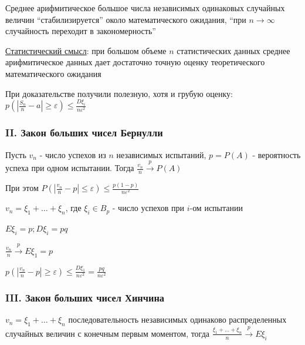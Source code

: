 \documentclass[12pt]{article}
\begin{document}
    Среднее арифмитическое большое числа независимых одинаковых случайных величин \enquote{стабилизируется} около математического ожидания,
    \enquote{при $n \to \infty$ случайность переходит в закономерность}

    \underline{Статистический смысл}: при большом объеме $n$ статистических данных среднее арифмитическое данных
    дает достаточно точную оценку теоретического математического ожидания

    \Nota При доказательстве получили полезную, хотя и грубую оценку: $p\left(\left|\frac{S_n}{n} - a\right| \geq \varepsilon\right) \leq \frac{D\xi_i}{n\varepsilon^2}$

    \subsubsection{II. Закон больших чисел Бернулли}

    \begin{MyTheorem}
        \Ths Пусть $v_n$ - число успехов из $n$ независимых испытаний, $p = P(A)$ - вероятность успеха при одном испытании.
        Тогда $\frac{v_n}{n} \overset{p}{\longrightarrow} P(A)$
    \end{MyTheorem}

    При этом $P\left(\left|\frac{v_n}{n} - p\right| \leq \varepsilon\right) \leq \frac{p(1 - p)}{n\varepsilon^2}$

    \begin{MyProof}
        $v_n = \xi_1 + \dots + \xi_n$, где $\xi_i \in B_p$ - число успехов при $i$-ом испытании

        $E\xi_i = p; D\xi_i = pq$

        $\frac{v_n}{n} \overset{p}{\longrightarrow} E\xi_1 = p$

        $p\left(\left|\frac{v_n}{n} - p\right| \geq \varepsilon\right) \leq \frac{D\xi_1}{n\varepsilon^2} = \frac{pq}{n\varepsilon^2}$
    \end{MyProof}

    \subsubsection{III. Закон больших чисел Хинчина}

    \begin{MyTheorem}
        \Ths $v_n = \xi_1 + \dots + \xi_n$ последовательность независимых одинаково распределенных случайных величин с конечным первым моментом, тогда
        $\frac{\xi_1 + \dots + \xi_n}{n} \overset{p}{\longrightarrow} E\xi_i$
    \end{MyTheorem}
\end{document}

